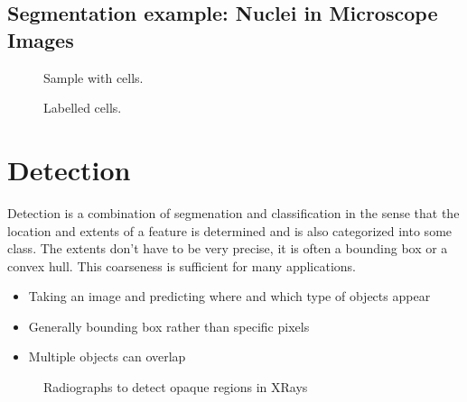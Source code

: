 \documentclass[letterpaper,10pt,english]{sphinxmanual}
\begin{document}
\subsection{Segmentation example: Nuclei in Microscope Images}
\label{\detokenize{03-Datasets:segmentation-example-nuclei-in-microscope-images}}
\begin{figure}[htbp]
\centering
\capstart

\noindent{}
\caption{Sample with cells.}\label{\detokenize{03-Datasets:id13}}\end{figure}

\begin{figure}[htbp]
\centering
\capstart

\noindent{}
\caption{Labelled cells.}\label{\detokenize{03-Datasets:id14}}\end{figure}



\sphinxAtStartPar
{}


\section{Detection}
\label{\detokenize{03-Datasets:detection}}
\sphinxAtStartPar
Detection is a combination of segmenation and classification in the sense that the location and extents of a feature is determined and is also categorized into some class. The extents don’t have to be very precise, it is often a bounding box or a convex hull. This coarseness is sufficient for many applications.
\begin{itemize}
\item {} 
\sphinxAtStartPar
Taking an image and predicting where and which type of objects appear

\item {} 
\sphinxAtStartPar
Generally bounding box rather than specific pixels

\item {} 
\sphinxAtStartPar
Multiple objects can overlap

\end{itemize}

\begin{figure}[htbp]
\centering
\capstart

\noindent{}
\caption{Radiographs to detect opaque regions in X\sphinxhyphen{}Rays}\label{\detokenize{03-Datasets:id15}}\end{figure}
\end{document}
